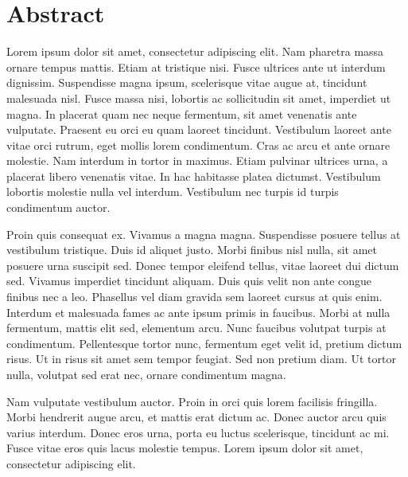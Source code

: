 \chapter{Abstract}\label{chap:abstract}

Lorem ipsum dolor sit amet, consectetur adipiscing elit. Nam pharetra massa
ornare tempus mattis. Etiam at tristique nisi. Fusce ultrices ante ut interdum
dignissim. Suspendisse magna ipsum, scelerisque vitae augue at, tincidunt
malesuada nisl. Fusce massa nisi, lobortis ac sollicitudin sit amet, imperdiet
ut magna. In placerat quam nec neque fermentum, sit amet venenatis ante
vulputate. Praesent eu orci eu quam laoreet tincidunt. Vestibulum laoreet ante
vitae orci rutrum, eget mollis lorem condimentum. Cras ac arcu et ante ornare
molestie. Nam interdum in tortor in maximus. Etiam pulvinar ultrices urna, a
placerat libero venenatis vitae. In hac habitasse platea dictumst. Vestibulum
lobortis molestie nulla vel interdum. Vestibulum nec turpis id turpis
condimentum auctor.

Proin quis consequat ex. Vivamus a magna magna. Suspendisse posuere tellus at
vestibulum tristique. Duis id aliquet justo. Morbi finibus nisl nulla, sit amet
posuere urna suscipit sed. Donec tempor eleifend tellus, vitae laoreet dui
dictum sed. Vivamus imperdiet tincidunt aliquam. Duis quis velit non ante congue
finibus nec a leo. Phasellus vel diam gravida sem laoreet cursus at quis enim.
Interdum et malesuada fames ac ante ipsum primis in faucibus. Morbi at nulla
fermentum, mattis elit sed, elementum arcu. Nunc faucibus volutpat turpis at
condimentum. Pellentesque tortor nunc, fermentum eget velit id, pretium dictum
risus. Ut in risus sit amet sem tempor feugiat. Sed non pretium diam. Ut tortor
nulla, volutpat sed erat nec, ornare condimentum magna.

Nam vulputate vestibulum auctor. Proin in orci quis lorem facilisis fringilla.
Morbi hendrerit augue arcu, et mattis erat dictum ac. Donec auctor arcu quis
varius interdum. Donec eros urna, porta eu luctus scelerisque, tincidunt ac mi.
Fusce vitae eros quis lacus molestie tempus. Lorem ipsum dolor sit amet,
consectetur adipiscing elit.

\newpage
